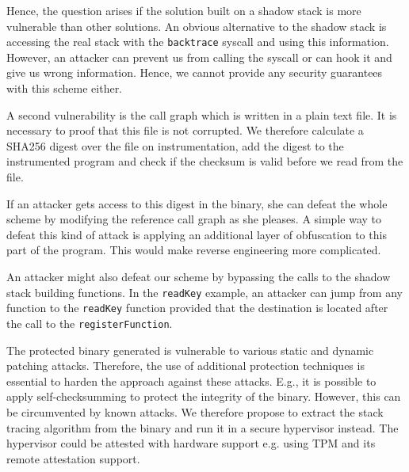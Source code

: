 \documentclass{llncs}
\begin{document}
Hence, the question arises if the solution built on a shadow stack is more vulnerable than other solutions. An obvious alternative to the shadow stack is accessing the real stack with the \texttt{backtrace} syscall and using this information. However, an attacker can prevent us from calling the syscall or can hook it and give us wrong information. Hence, we cannot provide any security guarantees with this scheme either.

A second vulnerability is the call graph which is written in a plain text file. It is necessary to proof that this file is not corrupted. We therefore calculate a SHA256 digest over the file on instrumentation, add the digest to the instrumented program and check if the checksum is valid before we read from the file.

If an attacker gets access to this digest in the binary, she can defeat the whole scheme by modifying the reference call graph as she pleases.
A simple way to defeat this kind of attack is applying an additional layer of obfuscation to this part of the program. This would make reverse engineering more complicated.%

An attacker might also defeat our scheme by bypassing the calls to the shadow stack building functions. In the \texttt{readKey} example, an attacker can jump from any function to the \texttt{readKey} function provided that the destination is located after the call to the \texttt{registerFunction}. %

The protected binary generated is vulnerable to various static and dynamic patching attacks. Therefore, the use of additional protection techniques is essential to harden the approach against these attacks. E.g., it is possible to apply self-checksumming to protect the integrity of the binary. However, this can be circumvented by known attacks. We therefore propose to extract the stack tracing algorithm from the binary and run it in a secure hypervisor instead. The hypervisor could be attested with hardware support e.g. using TPM and its remote attestation support.
\end{document}
